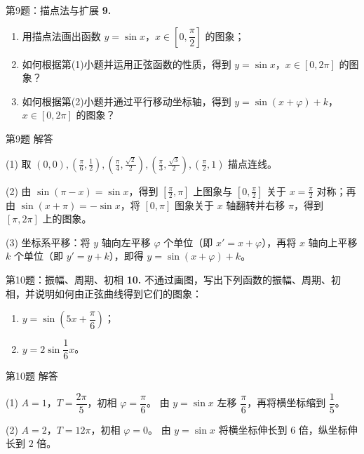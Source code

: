 \documentclass[10pt,aspectratio=169,serif]{beamer}
\begin{document}
\begin{frame}[t]{第9题：描点法与扩展}
\textbf{9.}
\begin{enumerate}
  \item 用描点法画出函数 $y=\sin x$，$x\in\left[0,\dfrac{\pi}{2}\right]$ 的图象；
  \item 如何根据第(1)小题并运用正弦函数的性质，得到 $y=\sin x$，$x\in[0,2\pi]$ 的图象？
  \item 如何根据第(2)小题并通过平行移动坐标轴，得到 $y=\sin(x+\varphi)+k$，$x\in[0,2\pi]$ 的图象？
\end{enumerate}
\end{frame}

\begin{frame}[t]{第9题 解答}
\begin{tcolorbox}[colback=orange!10,colframe=orange,title=\textbf{解}]
(1) 取 $(0,0),(\frac{\pi}{6},\frac12),(\frac{\pi}{4},\frac{\sqrt2}{2}),(\frac{\pi}{3},\frac{\sqrt3}{2}),(\frac{\pi}{2},1)$ 描点连线。

(2) 由 $\sin(\pi-x)=\sin x$，得到 $[\frac{\pi}{2},\pi]$ 上图象与 $[0,\frac{\pi}{2}]$ 关于 $x=\frac{\pi}{2}$ 对称；再由 $\sin(x+\pi)=-\sin x$，将 $[0,\pi]$ 图象关于 $x$ 轴翻转并右移 $\pi$，得到 $[\pi,2\pi]$ 上的图象。

(3) 坐标系平移：将 $y$ 轴向左平移 $\varphi$ 个单位（即 $x'=x+\varphi$），再将 $x$ 轴向上平移 $k$ 个单位（即 $y'=y+k$），即得 $y=\sin(x+\varphi)+k$。
\end{tcolorbox}
\end{frame}

\begin{frame}[t]{第10题：振幅、周期、初相}
\textbf{10.} 不通过画图，写出下列函数的振幅、周期、初相，并说明如何由正弦曲线得到它们的图象：
\begin{enumerate}
  \item $y=\sin\!\left(5x+\dfrac{\pi}{6}\right)$；
  \item $y=2\sin\dfrac16 x$。
\end{enumerate}
\end{frame}

\begin{frame}[t]{第10题 解答}
\begin{tcolorbox}[colback=orange!10,colframe=orange,title=\textbf{解}]
(1) $A=1$，$T=\dfrac{2\pi}{5}$，初相 $\varphi=\dfrac{\pi}{6}$。
由 $y=\sin x$ 左移 $\dfrac{\pi}{6}$，再将横坐标缩到 $\dfrac15$。

(2) $A=2$，$T=12\pi$，初相 $\varphi=0$。
由 $y=\sin x$ 将横坐标伸长到 $6$ 倍，纵坐标伸长到 $2$ 倍。
\end{tcolorbox}
\end{frame}
\end{document}
